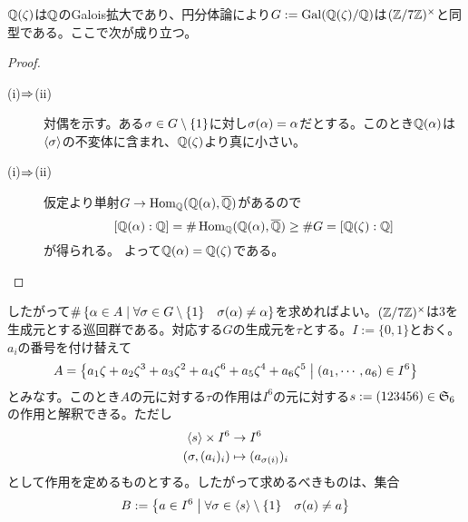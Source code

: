 \subsubsection{}%
\begin{sol}
  ${\mathbb Q}(\zeta)$は${\mathbb Q}$のGalois拡大であり、円分体論により$G:= \operatorname{Gal}({\mathbb Q}(\zeta)/ {\mathbb Q})$は$(\mathbb{Z} / 7 \mathbb{Z})^{\times}$と同型である。ここで次が成り立つ。

\begin{proof} ${}$
  \begin{description}
    \item[(i)$\Rightarrow$(ii)] 対偶を示す。ある${\sigma} \in G \setminus \{ 1 \}$に対し${\sigma}({\alpha})= {\alpha}$だとする。このとき${\mathbb Q}({\alpha})$は$\langle {\sigma} \rangle$の不変体に含まれ、${\mathbb Q}(\zeta)$より真に小さい。
    \item[(i)$\Rightarrow$(ii)] 仮定より単射$G \to \operatorname{Hom}_{{\mathbb Q}}({\mathbb Q}({\alpha}), \overline{{\mathbb Q}})$があるので
\[
[{\mathbb Q}({\alpha}): {\mathbb Q}] = \# \operatorname{Hom}_{{\mathbb Q}}({\mathbb Q}({\alpha}), \overline{{\mathbb Q}}) \geq \# G = [{\mathbb Q}(\zeta):{\mathbb Q}]
\]
    が得られる。
    よって${\mathbb Q}({\alpha}) = {\mathbb Q}(\zeta)$である。
  \end{description}
\end{proof}
したがって$\# \left\{  {\alpha} \in A  \mathrel{} \middle| \mathrel{}  \forall {\sigma} \in G \setminus \{ 1 \} \quad {\sigma}({\alpha}) \neq {\alpha}  \right\}$を求めればよい。$(\mathbb{Z} / 7 \mathbb{Z})^{\times}$は$3$を生成元とする巡回群である。対応する$G$の生成元を$\tau$とする。$I := \{ 0,1\}$とおく。$a_i$の番号を付け替えて
\[
A = \left\{   a_1 \zeta +  a_2 \zeta^3 +  a_3 \zeta^2 + a_4 \zeta^6 + a_5 \zeta^4  + a_6 \zeta^5  \mathrel{} \middle| \mathrel{}  (a_1, \cdots , a_6) \in I^6  \right\}
\]
とみなす。このとき$A$の元に対する$\tau$の作用は$I^6$の元に対する$s := (123456) \in \mathfrak{S}_6$の作用と解釈できる。ただし
\begin{align*}
\langle s \rangle \times I^6 &\to I^6 \\
({\sigma}, (a_i)_i ) &\mapsto (a_{{\sigma}(i)})_i
\end{align*}
として作用を定めるものとする。したがって求めるべきものは、集合
\[
 B :=  \left\{  a \in I^6  \mathrel{} \middle| \mathrel{}  \forall {\sigma} \in \langle s \rangle \setminus \{ 1 \} \quad {\sigma}(a) \neq a    \right\}
\]
\end{sol}
